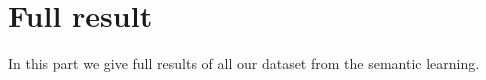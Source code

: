 \section{Full result}
In this part we give full results of all our dataset from the semantic learning.
